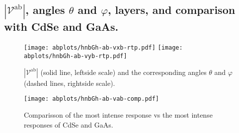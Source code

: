 \documentclass{article}
\let\Oldsubsection\subsection
\renewcommand{\subsection}{\FloatBarrier\Oldsubsection}
\begin{document}
\clearpage

\subsection{$|\mathcal{V}^{\mathrm{ab}}|$, angles
$\theta$ and $\varphi$, layers, and comparison with CdSe and GaAs.}
\begin{figure}[ht]
    \centering
    \texttt{[image: abplots/hnbGh-ab-vxb-rtp.pdf]}
    \texttt{[image: abplots/hnbGh-ab-vyb-rtp.pdf]}
    \caption{$|\mathcal{V}^{\mathrm{ab}}|$ (solid line, leftside scale) and the
    corresponding angles $\theta$ and $\varphi$ (dashed lines, rightside scale).}
    \label{fig:ab-rtp}
\end{figure}
 

\begin{figure}[ht]
    \centering
    \texttt{[image: abplots/hnbGh-ab-vab-comp.pdf]}
    \caption{Comparisson of the most intense response vs the most intense
    responses of CdSe and GaAs.}
    \label{fig:ab-comp}
\end{figure}




\end{document}
